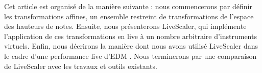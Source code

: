 Cet article est organisé de la manière suivante : nous commencerons par définir les transformations affines, un ensemble restreint de transformations de l'espace des hauteurs de notes. Ensuite, nous présenterons Live\-Scaler, qui implémente l'application de ces transformations en live à un nombre arbitraire d'instruments virtuels. Enfin, nous décrirons la manière dont nous avons utilisé LiveScaler dans le cadre d'une performance live d'EDM . Nous terminerons par une comparaison de LiveScaler avec les travaux et outils existants.
